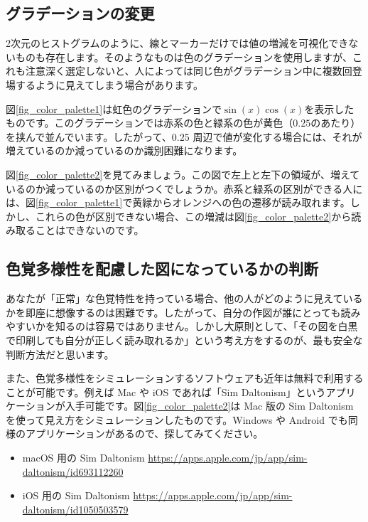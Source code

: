 \subsection{グラデーションの変更}

2次元のヒストグラムのように、線とマーカーだけでは値の増減を可視化できないものも存在します。そのようなものは色のグラデーションを使用しますが、これも注意深く選定しないと、人によっては同じ色がグラデーション中に複数回登場するように見えてしまう場合があります。

図\ref{fig_color_palette1}は虹色のグラデーションで$\sin(x)\cos(x)$を表示したものです。このグラデーションでは赤系の色と緑系の色が黄色（$0.25$のあたり）を挟んで並んでいます。したがって、$0.25$ 周辺で値が変化する場合には、それが増えているのか減っているのか識別困難になります。

図\ref{fig_color_palette2}を見てみましょう。この図で左上と左下の領域が、増えているのか減っているのか区別がつくでしょうか。赤系と緑系の区別ができる人には、図\ref{fig_color_palette1}で黄緑からオレンジへの色の遷移が読み取れます。しかし、これらの色が区別できない場合、この増減は図\ref{fig_color_palette2}から読み取ることはできないのです。


\subsection{色覚多様性を配慮した図になっているかの判断}

あなたが「正常」な色覚特性を持っている場合、他の人がどのように見えているかを即座に想像するのは困難です。したがって、自分の作図が誰にとっても読みやすいかを知るのは容易ではありません。しかし大原則として、「その図を白黒で印刷しても自分が正しく読み取れるか」という考え方をするのが、最も安全な判断方法だと思います。

また、色覚多様性をシミュレーションするソフトウェアも近年は無料で利用することが可能です。例えば Mac や iOS であれば「Sim Daltonism」というアプリケーションが入手可能です。図\ref{fig_color_palette2}は Mac 版の Sim Daltonism を使って見え方をシミュレーションしたものです。Windows や Android でも同様のアプリケーションがあるので、探してみてください。

\begin{itemize}
\item macOS 用の Sim Daltonism \url{https://apps.apple.com/jp/app/sim-daltonism/id693112260}
\item iOS 用の Sim Daltonism \url{https://apps.apple.com/jp/app/sim-daltonism/id1050503579}
\end{itemize}
